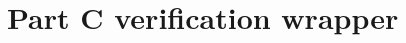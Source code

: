 \documentclass[11pt,a4paper]{article}
\begin{document}
\section{Part C verification wrapper}



\end{document}
